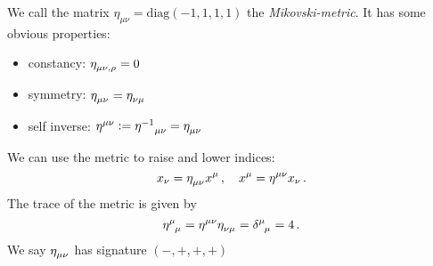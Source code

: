 We call the matrix $\eta_{\mu\nu}=\mathrm{diag}(-1,1,1,1)$ the
\emph{Mikovski-metric}. It has some obvious properties:
\begin{itemize}
  \item constancy: $\tensor{\eta}{_\mu_\nu_,_\rho}=0$
  \item symmetry: $\tensor{\eta}{_\mu_\nu}=\tensor{\eta}{_\nu_\mu}$
  \item self inverse:
  $\tensor{\eta}{^\mu^\nu}:=\tensor{{\eta^{-1}}}{_\mu_\nu}=\tensor{\eta}{_\mu_\nu}$
\end{itemize}
We can use the metric to raise and lower indices:
\begin{equation}
x_\nu=\tensor{\eta}{_\mu_\nu}x^\mu\, ,\quad x^\mu=\tensor{\eta}{^\mu^\nu}x_\nu\,
.
\end{equation}
The trace of the metric is given by
\begin{equation}
\tensor{\eta}{^\mu_\mu}=\tensor{\eta}{^\mu^\nu}\tensor{\eta}{_\nu_\mu}
=\tensor{\delta}{^\mu_\mu}=4\, .
\end{equation}
We say $\tensor{\eta}{_\mu_\nu}$ has signature $(-,+,+,+)$
